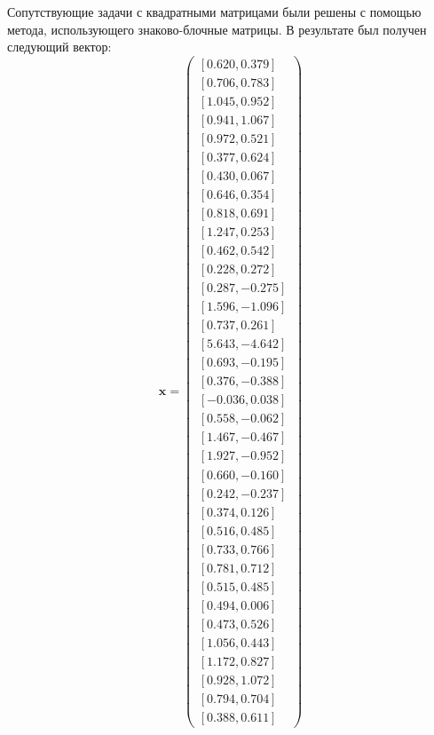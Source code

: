 Сопутствующие задачи с квадратными матрицами были решены с помощью метода, использующего знаково-блочные матрицы. В результате был получен следующий вектор:
\begin{equation}
\mathbf{x}=
\begin{pmatrix}
[0.620, 0.379] \\
[0.706, 0.783] \\
[1.045, 0.952] \\
[0.941, 1.067] \\
[0.972, 0.521] \\
[0.377, 0.624] \\
[0.430, 0.067] \\
[0.646, 0.354] \\
[0.818, 0.691] \\
[1.247, 0.253] \\
[0.462, 0.542] \\
[0.228, 0.272] \\
[0.287, -0.275] \\
[1.596, -1.096] \\ 
[0.737, 0.261] \\
[5.643, -4.642] \\
[0.693, -0.195] \\
[0.376, -0.388] \\
[-0.036, 0.038] \\
[0.558, -0.062] \\
[1.467, -0.467] \\
[1.927, -0.952] \\
[0.660, -0.160] \\
[0.242, -0.237] \\
[0.374, 0.126] \\
[0.516, 0.485] \\
[0.733, 0.766] \\
[0.781, 0.712] \\
[0.515, 0.485] \\
[0.494, 0.006] \\ 
[0.473, 0.526] \\
[1.056, 0.443] \\
[1.172, 0.827] \\
[0.928, 1.072] \\ 
[0.794, 0.704] \\
[0.388, 0.611]
\end{pmatrix}
\end{equation}